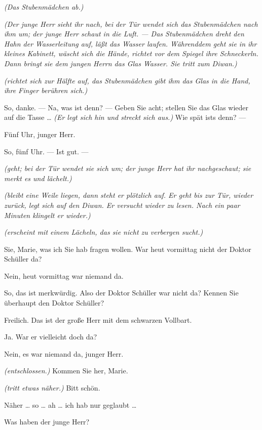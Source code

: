 \documentclass[
	final,
	a4paper,
	ngerman,
	mpinclude = true, %
	twoside = true,
	open = right,
	cleardoublepage = plain,
	DIV = 13,
	BCOR = 1cm,
	titlepage = firstiscover,
	]{scrbook}
\newcommand{\direction}[1]{\textit{(#1)}}
\newcommand{\thecharacter}[1]{\textup{\textsc{#1}}}
\newcommand{\themaedchen}{\thecharacter{Stubenmädchen}}
\newcommand{\theherr}{\thecharacter{Junger Herr}}
\newcommand{\character}[1]{\item[#1:]}
\newcommand{\maedchen}{\character{\themaedchen}}
\newcommand{\herr}{\character{\theherr}}
\begin{document}
\begin{play}
	\direction{Das Stubenmädchen ab.}

	\direction{Der junge Herr sieht ihr nach, bei der Tür wendet sich das Stubenmädchen nach ihm um; der junge Herr schaut in die Luft. --- Das Stubenmädchen dreht den Hahn der Wasserleitung auf, läßt das Wasser laufen. Währenddem geht sie in ihr kleines Kabinett, wäscht sich die Hände, richtet vor dem Spiegel ihre Schneckerln. Dann bringt sie dem jungen Herrn das Glas Wasser. Sie tritt zum Diwan.}

	\herr
	\direction{richtet sich zur Hälfte auf, das Stubenmädchen gibt ihm das Glas in die Hand, ihre Finger berühren sich.}

	\herr
	So, danke. --- Na, was ist denn? --- Geben Sie acht; stellen Sie das Glas wieder auf die Tasse \ldots{} \direction{Er legt sich hin und streckt sich aus.} Wie spät ists denn? ---

	\maedchen
	Fünf Uhr, junger Herr.

	\herr
	So, fünf Uhr. --- Ist gut. ---

	\maedchen
	\direction{geht; bei der Tür wendet sie sich um; der junge Herr hat ihr nachgeschaut; sie merkt es und lächelt.}

	\herr
	\direction{bleibt eine Weile liegen, dann steht er plötzlich auf. Er geht bis zur Tür, wieder zurück, legt sich auf den Diwan. Er versucht wieder zu lesen. Nach ein paar Minuten klingelt er wieder.}

	\maedchen
	\direction{erscheint mit einem Lächeln, das sie nicht zu verbergen sucht.}

	\herr
	Sie, Marie, was ich Sie hab fragen wollen. War heut vormittag nicht der Doktor Schüller da?

	\maedchen
	Nein, heut vormittag war niemand da.

	\herr
	So, das ist merkwürdig. Also der Doktor Schüller war nicht da? Kennen Sie überhaupt den Doktor Schüller?

	\maedchen
	Freilich. Das ist der große Herr mit dem schwarzen Vollbart.

	\herr
	Ja. War er vielleicht doch da?

	\maedchen
	Nein, es war niemand da, junger Herr.

	\herr
	\direction{entschlossen.} Kommen Sie her, Marie.

	\maedchen
	\direction{tritt etwas näher.} Bitt schön.

	\herr
	Näher \ldots{} so \ldots{} ah \ldots{} ich hab nur geglaubt \ldots{}

	\maedchen
	Was haben der junge Herr?


\end{play}
\end{document}
